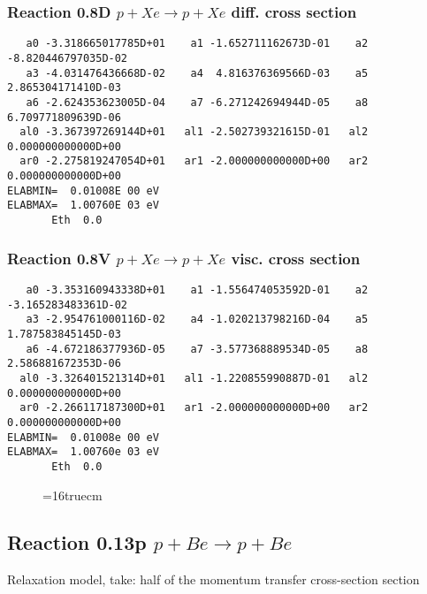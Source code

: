 \documentclass[12pt,dvipdfmx]{article}
\begin{document}
\subsubsection{
Reaction 0.8D    $p + Xe \rightarrow p + Xe  $ diff. cross
section }


\begin{small}\begin{verbatim}
   a0 -3.318665017785D+01    a1 -1.652711162673D-01    a2 -8.820446797035D-02
   a3 -4.031476436668D-02    a4  4.816376369566D-03    a5  2.865304171410D-03
   a6 -2.624353623005D-04    a7 -6.271242694944D-05    a8  6.709771809639D-06
  al0 -3.367397269144D+01   al1 -2.502739321615D-01   al2  0.000000000000D+00
  ar0 -2.275819247054D+01   ar1 -2.000000000000D+00   ar2  0.000000000000D+00
ELABMIN=  0.01008E 00 eV
ELABMAX=  1.00760E 03 eV
       Eth  0.0
\end{verbatim}\end{small}

\subsubsection{
Reaction 0.8V   $ p + Xe \rightarrow p + Xe  $ visc. cross
section }


\begin{small}\begin{verbatim}
   a0 -3.353160943338D+01    a1 -1.556474053592D-01    a2 -3.165283483361D-02
   a3 -2.954761000116D-02    a4 -1.020213798216D-04    a5  1.787583845145D-03
   a6 -4.672186377936D-05    a7 -3.577368889534D-05    a8  2.586881672353D-06
  al0 -3.326401521314D+01   al1 -1.220855990887D-01   al2  0.000000000000D+00
  ar0 -2.266117187300D+01   ar1 -2.000000000000D+00   ar2  0.000000000000D+00
ELABMIN=  0.01008e 00 eV
ELABMAX=  1.00760e 03 eV
       Eth  0.0
\end{verbatim}\end{small}


\begin{figure} \label{0.8}
\epsfxsize=16truecm
\end{figure}
\newpage

\subsection{
Reaction 0.13p   $ p + Be \rightarrow p + Be $
}

Relaxation model, take: half of the momentum transfer cross-section
section
\end{document}
